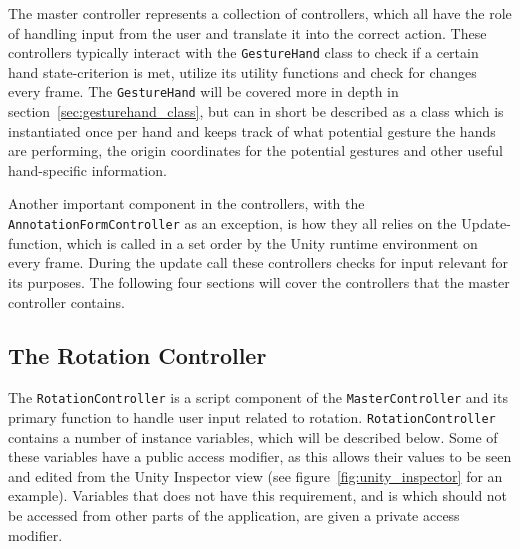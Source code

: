 The master controller represents a collection of controllers, which all have the role of handling input from the user and translate it into
the correct action. These controllers typically interact with the \texttt{GestureHand} class to check if a certain hand state-criterion
is met, utilize its utility functions and check for changes every frame. The \texttt{GestureHand} will be covered more in depth in section~\vref{sec:gesturehand_class}, 
but can in short be described as a class which is instantiated once per hand and keeps track of what potential gesture the hands are performing, the origin coordinates
for the potential gestures and other useful hand-specific information. 

Another important component in the controllers, with the \texttt{AnnotationFormController} as an exception, is how they all relies on the Update-function, 
which is called in a set order by the Unity runtime environment on every frame. During the update call these controllers checks for input relevant for its 
purposes. The following four sections will cover the controllers that the master controller contains.

\subsection{The Rotation Controller}
The \texttt{RotationController} is a script component of the \texttt{MasterController} and its primary function to handle user input related to rotation.
\texttt{RotationController} contains a number of instance variables, which will be described below. Some of these variables have a public access modifier, as
this allows their values to be seen and edited from the Unity Inspector view (see figure~\vref{fig:unity_inspector} for an example). Variables that does not
have this requirement, and is which should not be accessed from other parts of the application, are given a private access modifier.

